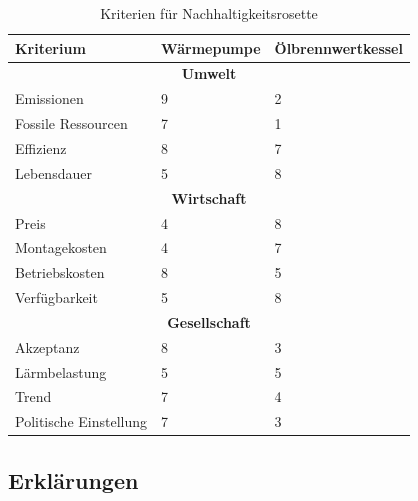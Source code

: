 \begin{table}
\begin{center}
\begin{tabular}[c]{|p{}|p{}|p{}|}

  \hline
  \textbf{Kriterium} &
  \textbf{Wärmepumpe} &
  \textbf{Ölbrennwertkessel} \\ \hline

  \multicolumn{3}{|c|}{\textbf{Umwelt}} \\ \hline
  
  Emissionen
  & 9 & 2 \\
  Fossile Ressourcen
  & 7 & 1 \\
  Effizienz
  & 8 & 7 \\
  Lebensdauer
  & 5 & 8 \\
  \hline
  
  \multicolumn{3}{|c|}{\textbf{Wirtschaft}} \\ \hline
  
  Preis
  & 4 & 8 \\
  Montagekosten
  & 4 & 7 \\
  Betriebskosten
  & 8 & 5 \\
  Verfügbarkeit
  & 5 & 8 \\
  \hline

  \multicolumn{3}{|c|}{\textbf{Gesellschaft}} \\ \hline

  Akzeptanz
  & 8 & 3 \\
  Lärmbelastung
  & 5 & 5 \\
  Trend
  & 7 & 4 \\
  Politische Einstellung
  & 7 & 3 \\
  \hline

\end{tabular}
\end{center}
\caption{Kriterien für Nachhaltigkeitsrosette}
\end{table}

\subsection{Erklärungen}

